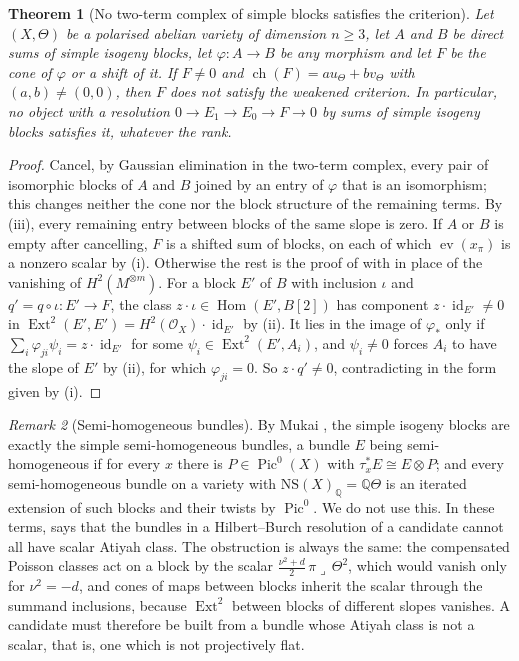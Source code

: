 \documentclass[11pt,reqno]{amsart}
\theoremstyle{plain}
\newtheorem{theorem}{Theorem}[section]
\theoremstyle{definition}
\theoremstyle{remark}
\newtheorem{remark}[theorem]{Remark}
\newcommand{\QQ}{\mathbb{Q}}
\newcommand{\cO}{\mathcal{O}}
\newcommand{\NS}{\mathrm{NS}}
\DeclareMathOperator{\ch}{ch}
\DeclareMathOperator{\Hom}{Hom}
\DeclareMathOperator{\Ext}{Ext}
\DeclareMathOperator{\Pic}{Pic}
\DeclareMathOperator{\id}{id}
\begin{document}
\begin{theorem}[No two-term complex of simple blocks satisfies the criterion]
\label{thm:noblocks}
Let $(X,\Theta)$ be a polarised abelian variety of dimension $n\ge3$, let $A$
and $B$ be direct sums of simple isogeny blocks, let $\varphi\colon A\to B$
be any morphism and let $F$ be the cone of $\varphi$ or a shift of it. If
$F\ne0$ and $\ch(F)=au_{\Theta}+bv_{\Theta}$ with $(a,b)\ne(0,0)$, then $F$
does not satisfy the weakened criterion. In particular, no object with a
resolution $0\to E_{1}\to E_{0}\to F\to0$ by sums of simple isogeny blocks
satisfies it, whatever the rank.
\end{theorem}

\begin{proof}
Cancel, by Gaussian elimination in the two-term complex, every pair of
isomorphic blocks of $A$ and $B$ joined by an entry of $\varphi$ that is an
isomorphism; this changes neither the cone nor the block structure of the
remaining terms. By (iii), every remaining entry between
blocks of the same slope is zero. If $A$ or $B$ is empty after cancelling,
$F$ is a shifted sum of blocks, on each of which $\operatorname{ev}(x_{\pi})$
is a nonzero scalar by (i). Otherwise the rest is the proof of
 with  in place of the vanishing of
$H^{2}(M^{\otimes m})$. For a block $E'$ of $B$ with inclusion $\iota$ and
$q'=q\circ\iota\colon E'\to F$, the class $z\cdot\iota\in\Hom(E',B[2])$ has
component $z\cdot\id_{E'}\ne0$ in $\Ext^{2}(E',E')=H^{2}(\cO_{X})\cdot\id_{E'}$
by (ii). It lies in the image of $\varphi_{*}$ only if
$\sum_{i}\varphi_{ji}\psi_{i}=z\cdot\id_{E'}$ for some
$\psi_{i}\in\Ext^{2}(E',A_{i})$, and $\psi_{i}\ne0$ forces $A_{i}$ to have
the slope of $E'$ by (ii), for which $\varphi_{ji}=0$. So $z\cdot q'\ne0$,
contradicting  in the form given by (i).
\end{proof}

\begin{remark}[Semi-homogeneous bundles]\label{rem:blocks}
By Mukai \cite{Muk78}, the simple isogeny blocks are exactly the simple
semi-homogeneous bundles, a bundle $E$ being semi-homogeneous if for every
$x$ there is $P\in\Pic^{0}(X)$ with $\tau_{x}^{*}E\cong E\otimes P$; and
every semi-homogeneous bundle on a variety with $\NS(X)_{\QQ}=\QQ\Theta$ is
an iterated extension of such blocks and their twists by $\Pic^{0}$. We do
not use this. In these terms,  says that the bundles in a
Hilbert--Burch resolution of a candidate cannot all have scalar Atiyah
class. The obstruction is always the same: the compensated Poisson classes
act on a block by the scalar $\tfrac{\nu^{2}+d}{2}\,\pi\lrcorner\,\Theta^{2}$,
which would vanish only for $\nu^{2}=-d$, and cones of maps between blocks
inherit the scalar through the summand inclusions, because $\Ext^{2}$
between blocks of different slopes vanishes. A candidate must therefore be
built from a bundle whose Atiyah class is not a scalar, that is, one which
is not projectively flat.
\end{remark}
\end{document}
